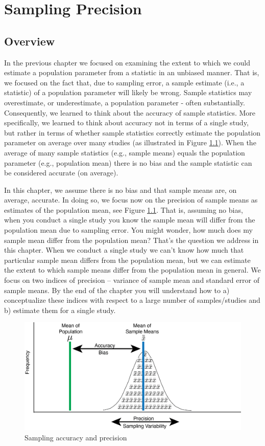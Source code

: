\documentclass[
]{krantz}
\begin{document}
\hypertarget{sampling-precision}{%
\chapter{Sampling Precision}\label{sampling-precision}}

\hypertarget{overview}{%
\section{Overview}\label{overview}}

In the previous chapter we focused on examining the extent to which we could estimate a population parameter from a statistic in an unbiased manner. That is, we focused on the fact that, due to sampling error, a sample estimate (i.e., a statistic) of a population parameter will likely be wrong. Sample statistics may overestimate, or underestimate, a population parameter - often substantially. Consequently, we learned to think about the accuracy of sample statistics. More specifically, we learned to think about accuracy not in terms of a single study, but rather in terms of whether sample statistics correctly estimate the population parameter on average over many studies (as illustrated in Figure \ref{fig:showbias2}). When the average of many sample statistics (e.g., sample means) equals the population parameter (e.g., population mean) there is no bias and the sample statistic can be considered accurate (on average).

In this chapter, we assume there is no bias and that sample means are, on average, accurate. In doing so, we focus now on the precision of sample means as estimates of the population mean, see Figure \ref{fig:showbias2}. That is, assuming no bias, when you conduct a single study you know the sample mean will differ from the population mean due to sampling error. You might wonder, how much does my sample mean differ from the population mean? That's the question we address in this chapter. When we conduct a single study we can't know how much that particular sample mean differs from the population mean, but we can estimate the extent to which sample means differ from the population mean in general. We focus on two indices of precision -- variance of sample mean and standard error of sample means. By the end of the chapter you will understand how to a) conceptualize these indices with respect to a large number of samples/studies and b) estimate them for a single study.

\begin{figure}
\includegraphics[width=0.8\linewidth]{ch_samples_precision/images/sampling_accuracy} \caption{Sampling accuracy and precision}\label{fig:showbias2}
\end{figure}
\end{document}
